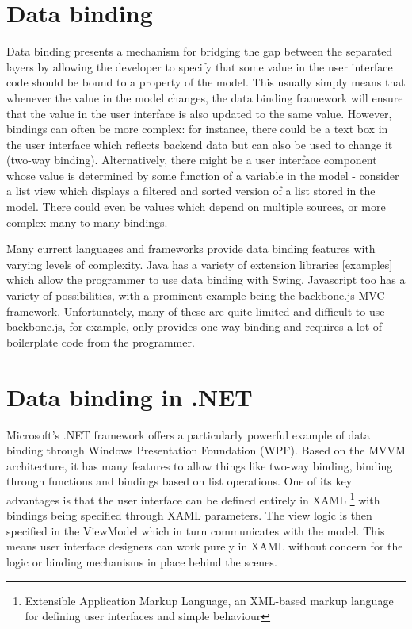 \documentclass[12pt,twoside,notitlepage]{report}
\begin{document}
\section{Data binding}

Data binding presents a mechanism for bridging the gap between the separated layers by allowing the developer to specify that some value in the user interface code should be bound to a property of the model. This usually simply means that whenever the value in the model changes, the data binding framework will ensure that the value in the user interface is also updated to the same value. However, bindings can often be more complex: for instance, there could be a text box in the user interface which reflects backend data but can also be used to change it (two-way binding). Alternatively, there might be a user interface component whose value is determined by some function of a variable in the model - consider a list view which displays a filtered and sorted version of a list stored in the model. There could even be values which depend on multiple sources, or more complex many-to-many bindings.

Many current languages and frameworks provide data binding features with varying levels of complexity. Java has a variety of extension libraries [examples] which allow the programmer to use data binding with Swing. Javascript too has a variety of possibilities, with a prominent example being the backbone.js MVC framework. Unfortunately, many of these are quite limited and difficult to use - backbone.js, for example, only provides one-way binding and requires a lot of boilerplate code from the programmer.

\section{Data binding in .NET}

Microsoft’s .NET framework offers a particularly powerful example of data binding through Windows Presentation Foundation (WPF). Based on the MVVM architecture, it has many features to allow things like two-way binding, binding through functions and bindings based on list operations. One of its key advantages is that the user interface can be defined entirely in XAML \footnote{Extensible Application Markup Language, an XML-based markup language for defining user interfaces and simple behaviour} with bindings being specified through XAML parameters. The view logic is then specified in the ViewModel which in turn communicates with the model. This means user interface designers can work purely in XAML without concern for the logic or binding mechanisms in place behind the scenes.
\end{document}
